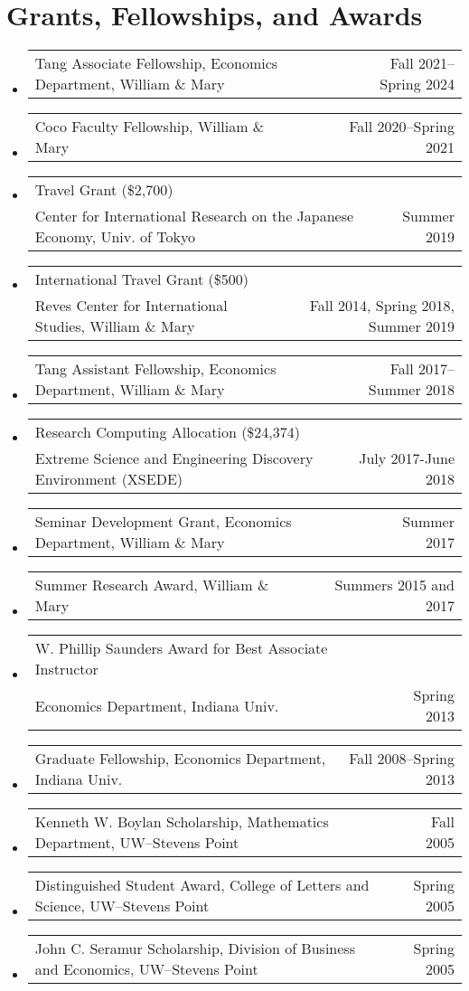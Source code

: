 \documentclass[10pt,letterpaper,en-US]{article}
\makeatletter
\newcommand{\itemrow}[2]
{\begin{tabular*}{\linewidth}{l@{\extracolsep{\fill}}r}
	#1 & #2 \\
\end{tabular*}}
\makeatother
\begin{document}
\section*{Grants, Fellowships, and Awards}
\begin{itemize}
\item \itemrow{Tang Associate Fellowship, Economics Department, William \& Mary}{Fall 2021--Spring 2024}
\item \itemrow{Coco Faculty Fellowship, William \& Mary}{Fall 2020--Spring 2021}
\item \itemrow{Travel Grant (\$2,700) \\ Center for International Research on the Japanese Economy, Univ. of Tokyo}{Summer 2019}
\item \itemrow{International Travel Grant (\$500) \\ Reves Center for International Studies, William \& Mary}{Fall 2014, Spring 2018, Summer 2019}
\item \itemrow{Tang Assistant Fellowship, Economics Department, William \& Mary}{Fall 2017--Summer 2018}
\item \itemrow{Research Computing Allocation (\$24,374)\\
Extreme Science and Engineering Discovery Environment (XSEDE)}{July 2017-June 2018}
\item \itemrow{Seminar Development Grant, Economics Department, William \& Mary}{Summer 2017}
\item \itemrow{Summer Research Award, William \& Mary}{Summers 2015 and 2017}
\item \itemrow{W. Phillip Saunders Award for Best Associate Instructor \\
Economics Department, Indiana Univ.}{Spring 2013}
\item \itemrow{Graduate Fellowship, Economics Department, Indiana Univ.}{Fall 2008--Spring 2013}
\item \itemrow{Kenneth W. Boylan Scholarship, Mathematics Department, UW--Stevens Point}{Fall 2005}
\item \itemrow{Distinguished Student Award, College of Letters and Science, UW--Stevens Point}{Spring 2005}
\item \itemrow{John C. Seramur Scholarship, Division of Business and Economics, UW--Stevens Point}{Spring 2005}
\end{itemize}
\newpage
\end{document}
